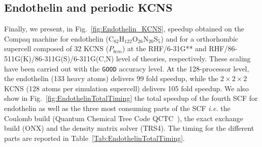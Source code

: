 \documentclass[prl,preprint,doublespace]{revtex4} %
\begin{document}
\subsection{Endothelin and periodic KCNS}
Finally, we present, in Fig.~\ref{fig:Endothelin_KCNS}, 
speedup obtained on the Compaq machine for 
endothelin (C$_{82}$H$_{122}$O$_{26}$N$_{20}$S$_5$) and
for a orthorhombic supercell composed of 32 KCNS ($P_{bcm}$)
at the RHF/6-31G** and RHF/86-511G(K)/86-311G(S)/6-311G(C,N) 
level of theories, respectively.
These scaling have been carried out with the {\tt GOOD} accuracy level.
At the 128-processor level, the endothelin (133 heavy atoms) delivers 99 fold
speedup, while the $2\times 2\times 2$ KCNS (128 atoms per simulation supercell)
delivers 105 fold speedup. 
We also show in Fig.~\ref{fig:EndothelinTotalTiming} the total speedup 
of the fourth SCF for endothelin as well as the three most consuming parts of the SCF
{\em i.e.} the Coulomb build (Quantum Chemical Tree Code QCTC~\cite{MChallacombe97}),
the exact exchange build (ONX) and the density matrix solver (TRS4).
The timing for the different parts are reported in Table~\ref{Tab:EndothelinTotalTiming}.
\end{document}
